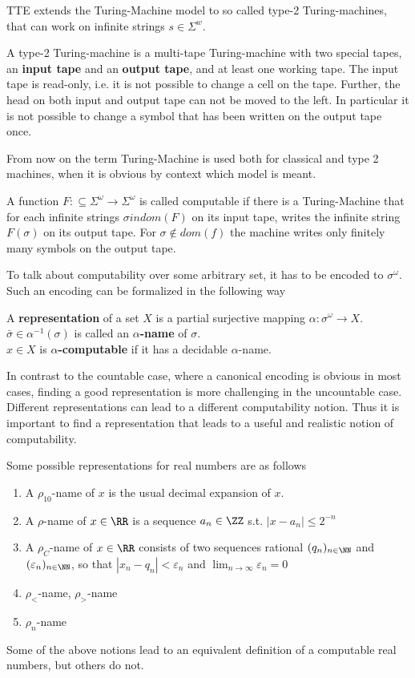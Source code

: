 TTE extends the Turing-Machine model to so called type-2 Turing-machines, that
can work on infinite strings $s \in \Sigma^w$. 
\begin{definition}
A type-2 Turing-machine is a multi-tape Turing-machine with two special tapes,
an \textbf{input tape} and an \textbf{output tape}, and at least one working
tape. 
The input tape is read-only, i.e. it is not possible to change a cell on the
tape. Further, the head on both input and output tape can not be moved to the
left. In particular it is not possible to change a symbol that has been written
on the output tape once. 
\end{definition}
From now on the term Turing-Machine is used both for classical and type 2
machines, when it is obvious by context which model is meant.
\begin{definition}\label{def:computability_ttt}
A function $F:\subseteq \Sigma^\omega \to \Sigma^\omega$ is called computable if there is a Turing-Machine  
that for each infinite strings $\sigma in dom(F)$ on its input tape, writes the infinite string $F(\sigma)$ on its output tape. 
For $\sigma \not \in dom(f)$ the machine writes only finitely many symbols on the output tape.  
\end{definition}
To talk about computability over some arbitrary set, it has to be encoded to
$\sigma^\omega$. 
Such an encoding can be formalized in the following way
\begin{definition}\label{def:representation}
	A \textbf{representation} of a set $X$ is a partial surjective mapping $\alpha: \sigma^\omega \to X$. \\
	$\bar \sigma \in \alpha^{-1}(\sigma)$ is called an \textbf{$\alpha$-name} of $\sigma$. \\
	$x \in X$ is \textbf{$\alpha$-computable} if it has a decidable $\alpha$-name.
\end{definition}

In contrast to the countable case, where a canonical encoding is obvious in most
cases, finding a good representation is more challenging in the uncountable
case.
Different representations can lead to a different computability notion.
Thus it is important to find a representation that leads to a useful and
realistic notion of computability.

Some possible representations for real numbers are as follows
\begin{enumerate}
\item A $\rho_{10}$-name of $x$ is the usual decimal expansion of $x$.
\item A $\rho$-name of $x \in \RR$ is a sequence $a_n \in \ZZ$ s.t. $| x - a_n | \leq 2^{-n}$
\item  A $\rho_C$-name of $x \in \RR$ consists of two sequences rational $(q_n)_{n \in \NN}$ and $(\varepsilon_n)_{n \in \NN}$, so that 
$| x_n - q_n | < \varepsilon_n$ and $\lim_{n \to \infty} \varepsilon_n = 0$  
\item $\rho_<$-name, $\rho_>$-name
\item $\rho_n$-name 
\end{enumerate}
Some of the above notions lead to an equivalent definition of a computable real
numbers, but others do not.


